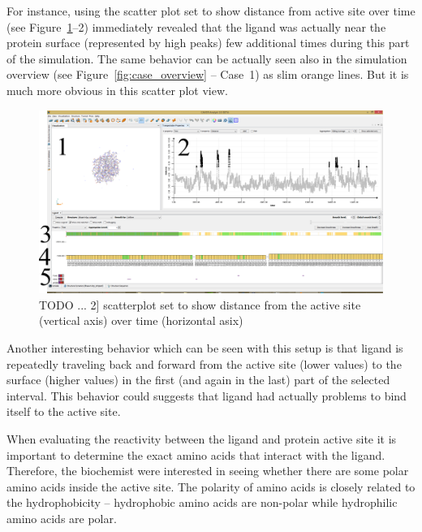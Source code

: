 \documentclass[twocolumn]{bmcart}%
\begin{document}
For instance, using the scatter plot set to show distance from active site over time (see Figure~\ref{fig:case_example1}--2) immediately revealed that the ligand was actually near the protein surface (represented by high peaks) few additional times during this part of the simulation.
The same behavior can be actually seen also in the simulation overview (see Figure~\ref{fig:case_overview} -- Case~1) as slim orange lines. 
But it is much more obvious in this scatter plot view.

\begin{figure}[htb]
	\centering
  \includegraphics[width=0.95\linewidth]{img/case_example_1.pdf}
  \caption{\label{fig:case_example1} {\color{red}TODO} ... 2] scatterplot set to show distance from the active site (vertical axis) over time (horizontal asix)}
\end{figure}

Another interesting behavior which can be seen with this setup is that ligand is repeatedly traveling back and forward from the active site (lower values) to the surface (higher values) in the first (and again in the last) part of the selected interval.
This behavior could suggests that ligand had actually problems to bind itself to the active site.

 
 


When evaluating the reactivity between the ligand and protein active site it is important to determine the exact amino acids that interact with the ligand. 
Therefore, the biochemist were interested in seeing whether there are some polar amino acids inside the active site.
The polarity of amino acids is closely related to the hydrophobicity -- hydrophobic amino acids are non-polar while hydrophilic amino acids are polar. 
\end{document}
